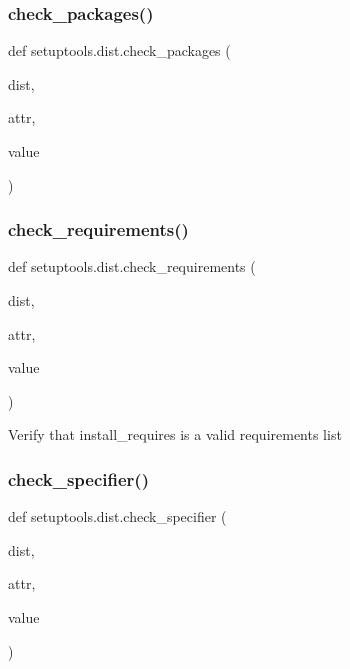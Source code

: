 \subsubsection{\texorpdfstring{check\+\_\+packages()}{check\_packages()}}
{\footnotesize\ttfamily def setuptools.\+dist.\+check\+\_\+packages (\begin{DoxyParamCaption}\item[{}]{dist,  }\item[{}]{attr,  }\item[{}]{value }\end{DoxyParamCaption})}

\mbox{\label{namespacesetuptools_1_1dist_a29a45dac0119a4bfaf9412a216a6fd41}} 
\subsubsection{\texorpdfstring{check\+\_\+requirements()}{check\_requirements()}}
{\footnotesize\ttfamily def setuptools.\+dist.\+check\+\_\+requirements (\begin{DoxyParamCaption}\item[{}]{dist,  }\item[{}]{attr,  }\item[{}]{value }\end{DoxyParamCaption})}

\begin{DoxyVerb}Verify that install_requires is a valid requirements list\end{DoxyVerb}
 \mbox{\label{namespacesetuptools_1_1dist_ad16e6b95535ea80403747b5ef21cd66d}} 
\subsubsection{\texorpdfstring{check\+\_\+specifier()}{check\_specifier()}}
{\footnotesize\ttfamily def setuptools.\+dist.\+check\+\_\+specifier (\begin{DoxyParamCaption}\item[{}]{dist,  }\item[{}]{attr,  }\item[{}]{value }\end{DoxyParamCaption})}


